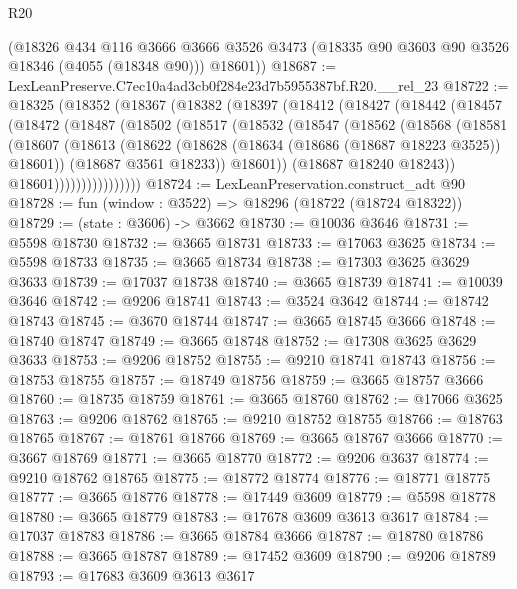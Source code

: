 \begin{lexlean}{R20}
\begin{coremodule}
      (@18326
        @434
        @116
        @3666
        @3666
        @3526
        @3473
        (@18335 @90 @3603 @90 @3526 @18346 (@4055 (@18348 @90)))
        @18601))
@18687 := LexLeanPreserve.C7ec10a4ad3cb0f284e23d7b5955387bf.R20.__rel_23
@18722 := @18325
    (@18352
      (@18367
        (@18382
          (@18397
            (@18412
              (@18427
                (@18442
                  (@18457
                    (@18472
                      (@18487
                        (@18502
                          (@18517
                            (@18532
                              (@18547
                                (@18562
                                  (@18568
                                    (@18581
                                      (@18607
                                        (@18613
                                          (@18622
                                            (@18628 (@18634 (@18686 (@18687 @18223 @3525)) @18601))
                                            (@18687 @3561 @18233))
                                          @18601))
                                      (@18687 @18240 @18243))
                                    @18601))))))))))))))))
@18724 := LexLeanPreservation.construct_adt @90
@18728 := fun (window : @3522) => @18296 (@18722 (@18724 @18322))
@18729 := (state : @3606) -> @3662
@18730 := @10036 @3646
@18731 := @5598 @18730
@18732 := @3665 @18731
@18733 := @17063 @3625
@18734 := @5598 @18733
@18735 := @3665 @18734
@18738 := @17303 @3625 @3629 @3633
@18739 := @17037 @18738
@18740 := @3665 @18739
@18741 := @10039 @3646
@18742 := @9206 @18741
@18743 := @3524 @3642
@18744 := @18742 @18743
@18745 := @3670 @18744
@18747 := @3665 @18745 @3666
@18748 := @18740 @18747
@18749 := @3665 @18748
@18752 := @17308 @3625 @3629 @3633
@18753 := @9206 @18752
@18755 := @9210 @18741 @18743
@18756 := @18753 @18755
@18757 := @18749 @18756
@18759 := @3665 @18757 @3666
@18760 := @18735 @18759
@18761 := @3665 @18760
@18762 := @17066 @3625
@18763 := @9206 @18762
@18765 := @9210 @18752 @18755
@18766 := @18763 @18765
@18767 := @18761 @18766
@18769 := @3665 @18767 @3666
@18770 := @3667 @18769
@18771 := @3665 @18770
@18772 := @9206 @3637
@18774 := @9210 @18762 @18765
@18775 := @18772 @18774
@18776 := @18771 @18775
@18777 := @3665 @18776
@18778 := @17449 @3609
@18779 := @5598 @18778
@18780 := @3665 @18779
@18783 := @17678 @3609 @3613 @3617
@18784 := @17037 @18783
@18786 := @3665 @18784 @3666
@18787 := @18780 @18786
@18788 := @3665 @18787
@18789 := @17452 @3609
@18790 := @9206 @18789
@18793 := @17683 @3609 @3613 @3617

\end{coremodule}
\end{lexlean}
